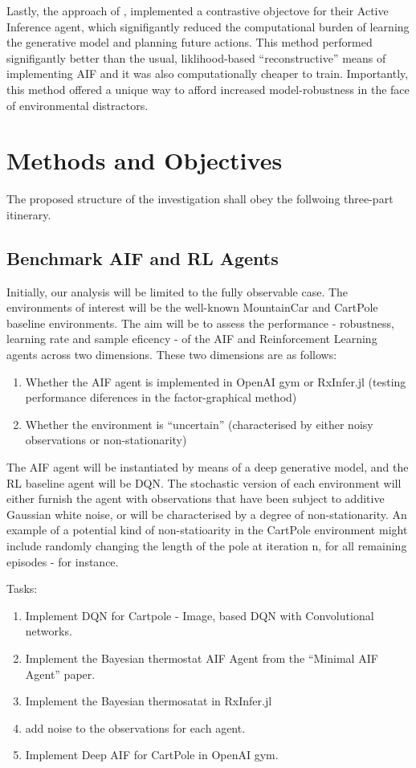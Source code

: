 \documentclass[12pt, twoside]{report}
\begin{document}
Lastly, the approach of \textcite{Contrastive-AIF}, implemented a contrastive objectove for their Active Inference agent, which signifigantly reduced the computational burden of learning the generative model and planning future actions. This method performed signifigantly better than the usual, liklihood-based ``reconstructive'' means of implementing AIF and it was also computationally cheaper to train. Importantly, this method offered a unique way to afford increased model-robustness in the face of environmental distractors. 


\section{Methods and Objectives}
The proposed structure of the investigation shall obey the follwoing three-part itinerary. 

\subsection{Benchmark AIF and RL Agents}
Initially, our analysis will be limited to the fully observable case. The environments of interest will be the well-known MountainCar and CartPole baseline environments. The aim will be to assess the performance - robustness, learning rate and sample eficency - of the AIF and Reinforcement Learning agents across two dimensions. These two dimensions are as follows:
\begin{enumerate}
\item Whether the AIF agent is implemented in OpenAI gym or RxInfer.jl (testing performance diferences in the factor-graphical method)
\item Whether the environment is ``uncertain'' (characterised by either noisy observations or non-stationarity)
\end{enumerate}

The AIF agent will be instantiated by means of a deep generative model, and the RL baseline agent will be DQN. The stochastic version of each environment will either furnish the agent with observations that have been subject to additive Gaussian white noise, or will be characterised by a degree of non-stationarity. An example of a potential kind of non-statioarity in the CartPole environment might include randomly changing the length of the pole at iteration n, for all remaining episodes - for instance.  

Tasks:
\begin{enumerate}
\item Implement DQN for Cartpole - Image, based DQN with Convolutional networks. 
\item Implement the Bayesian thermostat AIF Agent from the ``Minimal AIF Agent'' paper.
\item Implement the Bayesian thermosatat in RxInfer.jl
\item add noise to the observations for each agent.
\item Implement Deep AIF for CartPole in OpenAI gym.
\end{enumerate}
\end{document}
